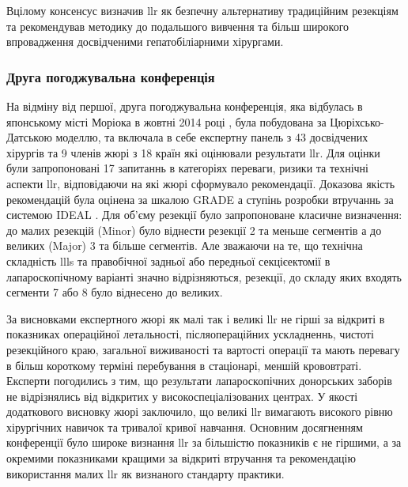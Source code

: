 \begin{refsection}
Вцілому консенсус визначив \acrshort{llr} як безпечну альтернативу традиційним резекціям та рекомендував методику до подальшого вивчення та більш широкого впровадження досвідченими гепатобіліарними хірургами.

\subsubsection{Друга погоджувальна конференція} 
На відміну від першої, друга погоджувальна конференція, яка відбулась в японському місті Моріока в жовтні 2014 році \cite{Kaneko2015}, була побудована за Цюріхсько-Датською моделлю, та включала в себе експертну панель з 43 досвідчених хірургів та 9 членів жюрі з 18 країн які оцінювали результати \acrshort{llr}. Для оцінки були запропоновані 17 запитаннь в категоріях переваги, ризики та технічні аспекти \acrshort{llr}, відповідаючи на які жюрі сформувало рекомендації. Доказова якість рекомендацій була оцінена за шкалою GRADE а ступінь розробки втручаннь за системою IDEAL \cite{Guyatt2008, McCulloch2009}. Для об'єму резекції було запропоноване класичне визначення: до малих резекцій (Minor) було віднести резекції 2 та меньше сегментів а до великих (Major) 3 та більше сегментів. Але зважаючи на те, що технічна складність \acrshort{llls} та правобічної задньої або передньої секцієектомії в лапароскопічному варіанті значно відрізняються, резекції, до складу яких входять сегменти 7 або 8 було віднесено до великих. 

За висновками експертного жюрі як малі так і великі \acrshort{llr} не гірші за відкриті в показниках операційної летальності, післяопераційних ускладненнь, чистоті резекційного краю, загальної виживаності та вартості операції та мають перевагу в більш короткому терміні перебування в стаціонарі, меншій крововтраті. Експерти погодились з тим, що результати лапароскопічних донорських заборів не відрізнялись від відкритих у високоспеціалізованих центрах. У якості додаткового висновку жюрі заключило, що великі \acrshort{llr} вимагають високого рівню хірургічних навичок та тривалої кривої навчання.
Основним досягненням конференції було широке визнання \acrshort{llr} за більшістю показників є не гіршими, а за окремими показниками кращими за відкриті втручання та рекомендацію використання малих \acrshort{llr} як визнаного стандарту практики.


\end{refsection}

